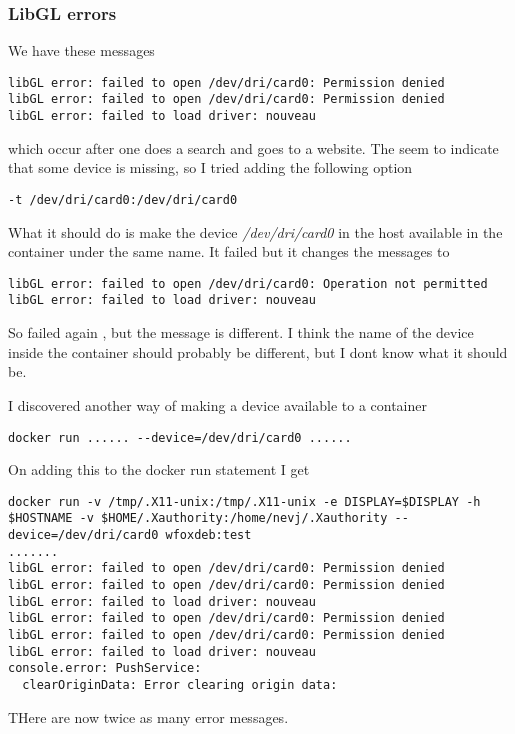 \documentclass[a4paper]{article}  %
\begin{document}
\subsubsection{LibGL errors}
We have these  messages
\begin{tcolorbox}
\begin{verbatim}
libGL error: failed to open /dev/dri/card0: Permission denied
libGL error: failed to open /dev/dri/card0: Permission denied
libGL error: failed to load driver: nouveau
\end{verbatim}
\end{tcolorbox}
which occur after one does a search and goes to a website. The seem to indicate that some device is missing, so I tried adding the following option
\begin{tcolorbox}
\begin{verbatim}
-t /dev/dri/card0:/dev/dri/card0
\end{verbatim}
\end{tcolorbox}
What it should do is make the device {\em /dev/dri/card0} in the host available in the container under the same name. 
It failed but it changes the messages to
\begin{tcolorbox}
\begin{verbatim}
libGL error: failed to open /dev/dri/card0: Operation not permitted
libGL error: failed to load driver: nouveau
\end{verbatim}
\end{tcolorbox}
So failed again , but the message is different. 
I think the name of the device inside the container should probably be different, but I dont know what it should be.

I discovered another way of making a device available to a container
\begin{tcolorbox}
\begin{verbatim}
docker run ...... --device=/dev/dri/card0 ......
\end{verbatim}
\end{tcolorbox}
On adding this to the docker run statement I get
\begin{tcolorbox}
\begin{verbatim} 
docker run -v /tmp/.X11-unix:/tmp/.X11-unix -e DISPLAY=$DISPLAY -h $HOSTNAME -v $HOME/.Xauthority:/home/nevj/.Xauthority --device=/dev/dri/card0 wfoxdeb:test
.......
libGL error: failed to open /dev/dri/card0: Permission denied
libGL error: failed to open /dev/dri/card0: Permission denied
libGL error: failed to load driver: nouveau
libGL error: failed to open /dev/dri/card0: Permission denied
libGL error: failed to open /dev/dri/card0: Permission denied
libGL error: failed to load driver: nouveau
console.error: PushService: 
  clearOriginData: Error clearing origin data:
\end{verbatim}
\end{tcolorbox}
THere are now twice as many error messages.
\end{document}
